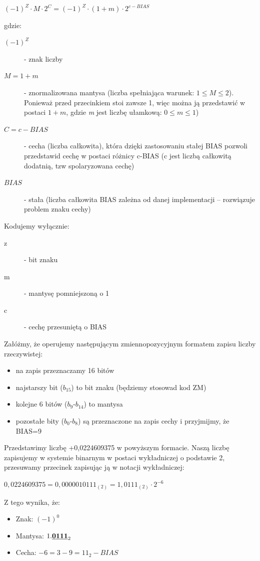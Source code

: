 \documentclass[a4paper,12pt,oneside]{book}
\begin{document}
\begin{center}
	$(-1)^Z \cdot M \cdot 2^C = (-1)^Z \cdot (1+m) \cdot 2^{c - BIAS}$
\end{center}
gdzie:
\begin{description}
	\item[$(-1)^Z$] - znak liczby
	\item[$M=1+m$] - znormalizowana mantysa (liczba spełniająca warunek: $1 \leq M \leq 2$). Ponieważ przed przecinkiem stoi zawsze 1, więc można ją przedstawić w postaci $1+m$, gdzie \emph{m} jest liczbę ułamkową: $0 \leq m \leq 1$)
	\item[$C=c-BIAS$] - cecha (liczba całkowita), która dzięki zastosowaniu stałej BIAS pozwoli przedstawid cechę w postaci
	różnicy c-BIAS (c jest liczbą całkowitą dodatnią, tzw spolaryzowana cechę)
	\item[$BIAS$] - stała (liczba całkowita BIAS zależna od danej implementacji – rozwiązuje problem znaku cechy)
\end{description}
Kodujemy wyłącznie:
\begin{description}
	\item[z] - bit znaku
	\item[m] - mantysę pomniejszoną o 1
	\item[c] - cechę przesuniętą o BIAS
\end{description}

Załóżmy, że operujemy następującym zmiennopozycyjnym formatem zapisu liczby rzeczywistej:
\begin{itemize}
	\item na zapis przeznaczamy 16 bitów
	\item najstarszy bit ($b_{15}$) to bit znaku (będziemy stosowad kod ZM)
	\item kolejne 6 bitów ($b_{9}$-$b_{14}$) to mantysa
	\item pozostałe bity ($b_0$-$b_8$) są przeznaczone na zapis cechy i przyjmijmy, że BIAS=9
\end{itemize}

Przedstawimy liczbę +0,0224609375 w powyższym formacie. Naszą liczbę zapisujemy w systemie binarnym w
postaci wykładniczej o podstawie 2, przesuwamy przecinek zapisując ją w notacji wykładniczej:

\begin{center}
	$0,0224609375 = 0,0000010111_{(2)} = 1,0111_{(2)} \cdot 2^{-6}$
\end{center}

Z tego wynika, że:

\begin{itemize}
	\item Znak: $(-1)^0$
	\item Mantysa: $1.\textbf{\underline{0111}}_2$
	\item Cecha: $-6 = 3-9 = 11_2 - BIAS$
\end{itemize}
\end{document}
